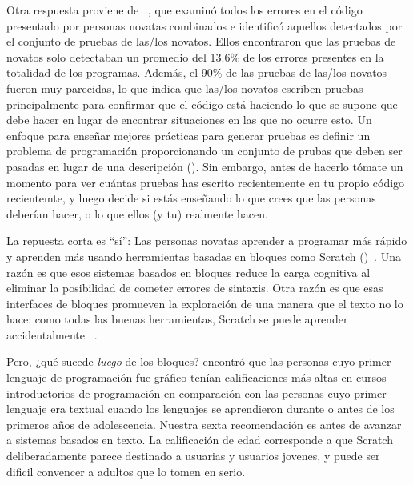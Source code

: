 Otra respuesta proviene de ~\cite{Edwa2014b},
que examinó todos los errores en el código presentado por personas novatas combinados
e identificó aquellos detectados por el conjunto de pruebas de las/los novatos.
Ellos encontraron que las pruebas de novatos solo detectaban un promedio del 13.6\% de los errores presentes en la totalidad de los programas.
Además,
el 90\% de las pruebas de las/los novatos fueron muy parecidas,
lo que indica que las/los novatos escriben pruebas principalmente para confirmar que el código está haciendo lo que se supone que debe hacer
en lugar de encontrar situaciones en las que no ocurre esto.
Un enfoque para enseñar mejores prácticas para generar pruebas es 
definir un problema de programación proporcionando un conjunto de prubas que deben ser pasadas
en lugar de una descripción ().
Sin embargo,
antes de hacerlo 
tómate un momento para ver cuántas pruebas has escrito recientemente en tu propio código recientemte,
y luego decide si estás enseñando lo que crees que las personas deberían hacer,
 o lo que ellos (y tu) realmente hacen.


La repuesta corta es ``sí'':
Las personas novatas aprender a programar más rápido y aprenden más 
usando herramientas basadas en bloques como Scratch ()~\cite{Wein2017}.
Una razón es que esos sistemas basados en bloques reduce la carga cognitiva al eliminar la posibilidad de cometer errores de sintaxis.
Otra razón es que esas interfaces de bloques promueven la exploración de una manera que el texto no lo hace:
como todas las buenas herramientas,
Scratch se puede aprender accidentalmente ~\cite{Malo2010}.

Pero, ¿qué sucede \emph{luego} de los bloques?
\cite{Chen2018} encontró que las personas cuyo primer lenguaje de programación fue gráfico
tenían calificaciones más altas en cursos introductorios de programación
en comparación con las personas cuyo primer lenguaje era textual
cuando los lenguajes se aprendieron durante o antes de los primeros años de adolescencia.
Nuestra sexta recomendación es 
antes de avanzar a sistemas basados en texto.
La calificación de edad corresponde a que  Scratch deliberadamente parece destinado a usuarias y usuarios jovenes,
y puede ser dificil convencer a adultos que lo tomen en serio.

